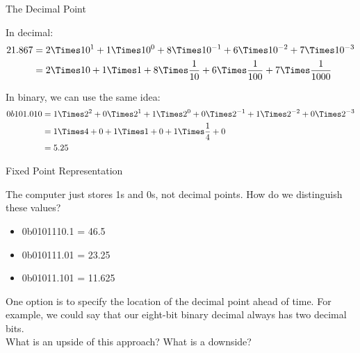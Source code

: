 \begin{frame}{The Decimal Point}

    In decimal:
    \begin{align*}
        21.867 & = 2 \Times 10^1 + 1 \Times 10^0 + 8 \Times 10^{-1} + 6 \Times 10^{-2} + 7 \Times 10^{-3}             \\
               & =2 \Times 10 + 1 \Times 1 + 8 \Times \frac{1}{10} + 6 \Times \frac{1}{100} + 7 \Times \frac{1}{1000} \\
    \end{align*}

    In binary, we can use the same idea:
    \begin{align*}
        0b101.010 & = 1 \Times 2^2 + 0 \Times 2^1 + 1 \Times 2^0 + 0 \Times 2^{-1} + 1 \Times 2^{-2} + 0 \Times 2^{-3} \\
                  & = 1 \Times 4 + 0 + 1 \Times 1 + 0 + 1 \Times \frac{1}{4} + 0                                       \\
                  & = 5.25                                                                                             \\
    \end{align*}

\end{frame}

\begin{frame}{Fixed Point Representation}

    The computer just stores 1s and 0s, not decimal points. How do we distinguish
    these values?
    \begin{itemize}
        \item 0b0101110.1 = 46.5
        \item 0b010111.01 = 23.25
        \item 0b01011.101 = 11.625
    \end{itemize}

    One option is to specify the location of the decimal point ahead of time. For
    example, we could say that our eight-bit binary decimal always has two decimal
    bits. \\

    What is an upside of this approach? What is a downside?

\end{frame}

